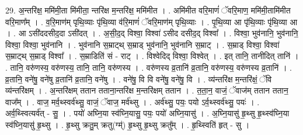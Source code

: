 \documentclass[17pt]{extarticle}
\begin{document}
29. अ॒न्तरि॑क्ष॒ ममि॑मी॒ता मि॑मीता॒ न्तरि॑क्ष म॒न्तरि॑क्ष॒ ममि॑मीत । . अमि॑मीत वरि॒माणं॑ ॅवरि॒माण॒ ममि॑मी॒तामि॑मीत वरि॒माण᳚म् । . व॒रि॒माण॑म् पृथि॒व्याः पृ॑थि॒व्या व॑रि॒माणं॑ ॅवरि॒माण॑म् पृथि॒व्याः । . पृ॒थि॒व्या आ पृ॑थि॒व्याः पृ॑थि॒व्या आ । . आ ऽसी॑ददसीद॒दा ऽसी॑दत् । . अ॒सी॒द॒द् विश्वा॒ विश्वा॑ ऽसीद दसीद॒द् विश्वा᳚ । . विश्वा॒ भुव॑नानि॒ भुव॑नानि॒ विश्वा॒ विश्वा॒ भुव॑नानि । . भुव॑नानि स॒म्राट्थ् स॒म्राड् भुव॑नानि॒ भुव॑नानि स॒म्राट् । . स॒म्राड् विश्वा॒ विश्वा॑ स॒म्राट्थ् स॒म्राड् विश्वा᳚ । . स॒म्राडिति॑ सं - राट् । . विश्वेदिद् विश्वा॒ विश्वेत् । . इत् तानि॒ तानीदित् तानि॑ । . तानि॒ वरु॑णस्य॒ वरु॑णस्य॒ तानि॒ तानि॒ वरु॑णस्य । . वरु॑णस्य व्र॒तानि॑ व्र॒तानि॒ वरु॑णस्य॒ वरु॑णस्य व्र॒तानि॑ । . व्र॒तानि॒ वने॑षु॒ वने॑षु व्र॒तानि॑ व्र॒तानि॒ वने॑षु । . वने॑षु॒ वि वि वने॑षु॒ वने॑षु॒ वि । . व्य॑न्तरि॑क्ष म॒न्तरि॑क्षं॒ ॅवि व्य॑न्तरि॑क्षम् । . अ॒न्तरि॑क्षम् ततान तताना॒न्तरि॑क्ष म॒न्तरि॑क्षम् ततान । . त॒ता॒न॒ वाजं॒ ॅवाज॑म् ततान ततान॒ वाज᳚म् । . वाज॒ मर्व॒थ्स्वर्व॑थ्सु॒ वाजं॒ ॅवाज॒ मर्व॑थ्सु । . अर्व॑थ्सु॒ पयः॒ पयो ऽर्व॒थ्स्वर्व॑थ्सु॒ पयः॑ । . अर्व॒थ्स्वित्यर्व॑त् - सु॒ । . पयो॑ अघ्नि॒या स्व॑घ्नि॒यासु॒ पयः॒ पयो॑ अघ्नि॒यासु॑ । . अ॒घ्नि॒यासु॑ हृ॒थ्सु हृ॒थ्स्व॑घ्नि॒या स्व॑घ्नि॒यासु॑ हृ॒थ्सु । . हृ॒थ्सु क्रतु॒म् क्रतु(ग्म्॑) हृ॒थ्सु हृ॒थ्सु क्रतु᳚म् । . हृ॒थ्स्विति॑ हृत् - सु । \newline
\end{document}
